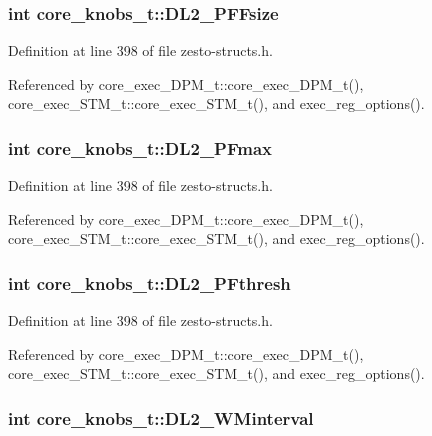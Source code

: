 \subsubsection[{DL2\_\-PFFsize}]{\setlength{\rightskip}{0pt plus 5cm}int {\bf core\_\-knobs\_\-t::DL2\_\-PFFsize}}\label{structcore__knobs__t_7bed9bef873af10719a4f7612db00824}




Definition at line 398 of file zesto-structs.h.

Referenced by core\_\-exec\_\-DPM\_\-t::core\_\-exec\_\-DPM\_\-t(), core\_\-exec\_\-STM\_\-t::core\_\-exec\_\-STM\_\-t(), and exec\_\-reg\_\-options().
\subsubsection[{DL2\_\-PFmax}]{\setlength{\rightskip}{0pt plus 5cm}int {\bf core\_\-knobs\_\-t::DL2\_\-PFmax}}\label{structcore__knobs__t_77aa906953a0ad27700ce772153e0a01}




Definition at line 398 of file zesto-structs.h.

Referenced by core\_\-exec\_\-DPM\_\-t::core\_\-exec\_\-DPM\_\-t(), core\_\-exec\_\-STM\_\-t::core\_\-exec\_\-STM\_\-t(), and exec\_\-reg\_\-options().
\subsubsection[{DL2\_\-PFthresh}]{\setlength{\rightskip}{0pt plus 5cm}int {\bf core\_\-knobs\_\-t::DL2\_\-PFthresh}}\label{structcore__knobs__t_f8779dabfec7256680389be34001e97a}




Definition at line 398 of file zesto-structs.h.

Referenced by core\_\-exec\_\-DPM\_\-t::core\_\-exec\_\-DPM\_\-t(), core\_\-exec\_\-STM\_\-t::core\_\-exec\_\-STM\_\-t(), and exec\_\-reg\_\-options().
\subsubsection[{DL2\_\-WMinterval}]{\setlength{\rightskip}{0pt plus 5cm}int {\bf core\_\-knobs\_\-t::DL2\_\-WMinterval}}\label{structcore__knobs__t_b8be3cd539aa8106287a59794c98b2e2}





